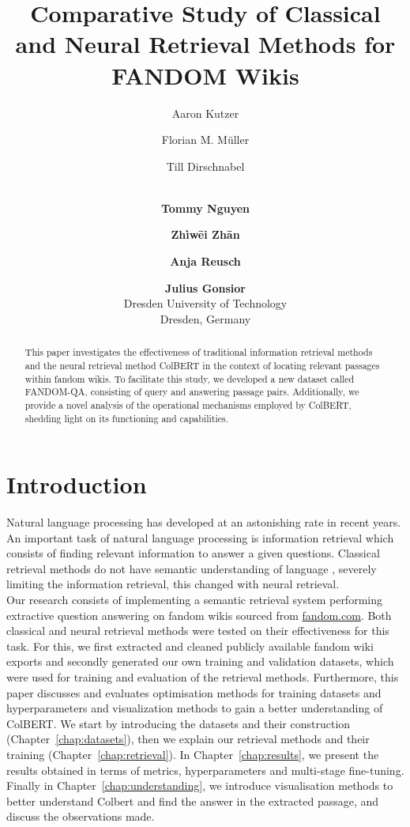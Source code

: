 \documentclass[11pt]{article}
\title{
Comparative Study of Classical and Neural Retrieval Methods for FANDOM Wikis
}
\author{
Aaron Kutzer \and Florian M. Müller \and Till Dirschnabel  \and \\
{\bf Tommy Nguyen} \and {\bf Zhìwēi Zhān} \and {\bf Anja Reusch} \and {\bf Julius Gonsior} \\
Dresden University of Technology \\ Dresden, Germany
}
\begin{document}
\maketitle
\begin{abstract}
This paper investigates the effectiveness of traditional information retrieval methods and the neural retrieval method ColBERT in the context of locating relevant passages within fandom wikis. To facilitate this study, we developed a new dataset called FANDOM-QA, consisting of query and answering passage pairs. Additionally, we provide a novel analysis of the operational mechanisms employed by ColBERT, shedding light on its functioning and capabilities.
\end{abstract}


\section{Introduction}
Natural language processing has developed at an astonishing rate in recent years. 
An important task of natural language processing is information retrieval which consists of finding relevant information to answer a given questions. Classical retrieval methods do not have semantic understanding of language \cite{hambarde2023information}, severely limiting the information retrieval, this changed with neural retrieval. \\
Our research consists of implementing a semantic retrieval system performing extractive question answering on fandom wikis sourced from \href{https://www.fandom.com/}{fandom.com}. Both classical and neural retrieval methods were tested on their effectiveness for this task. For this, we first extracted and cleaned publicly available fandom wiki exports and secondly generated our own training and validation datasets, which were used for training and evaluation of the retrieval methods.
Furthermore, this paper discusses and evaluates optimisation methods for training datasets and hyperparameters and visualization methods to gain a better understanding of ColBERT.
We start by introducing the datasets and their construction (Chapter~\ref{chap:datasets}), then we explain our retrieval methods and their training (Chapter~\ref{chap:retrieval}). In Chapter~\ref{chap:results}, we present the results obtained in terms of metrics, hyperparameters and multi-stage fine-tuning.
Finally in Chapter~\ref{chap:understanding}, we introduce visualisation methods to better understand Colbert and find the answer in the extracted passage, and discuss the observations made.
\end{document}
